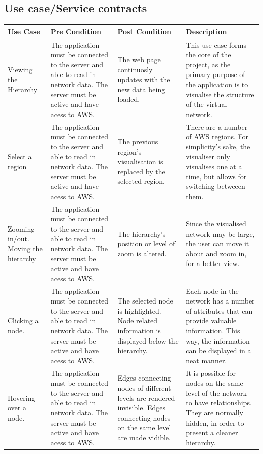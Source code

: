 \documentclass[hidelinks,a4paper,12pt]{article}
\begin{document}
		\subsection{Use case/Service contracts}
		\begin{tabular}{ | p{3cm} | p{4cm} | p{4cm} | p{4cm} |}
			\hline
			Use Case & Pre Condition & Post Condition & Description \\ \hline
			
			Viewing the Hierarchy & The application must be connected to the server and able to read in network data. The server must be active and have acess to AWS.& The web page continuosly updates with the new data being loaded. & This use case forms the core of the project, as the primary purpose of the application is to visualise the structure of the virtual network.\\ \hline
			
			Select a region 	& The application must be connected to the server and able to read in network data. The server must be active and have acess to AWS.& The previous region's visualisation is replaced by the selected region. & There are a number of AWS regions. For simplicity's sake, the visualiser only visualises one at a time, but allows for switching betweeen them.\\ \hline
			
			Zooming in/out. Moving the hierarchy	& The application must be connected to the server and able to read in network data. The server must be active and have acess to AWS.& The hierarchy's position or level of zoom is altered. & Since the visualised network may be large, the user can move it about and zoom in, for a better view.\\ \hline
			
			Clicking a node.& The application must be connected to the server and able to read in network data. The server must be active and have acess to AWS.& The selected node is highlighted. Node related information is displayed below the hierarchy. & Each node in the network has a number of attributes that can provide valuable information. This way, the information can be displayed in a neat manner.\\ \hline
			
			Hovering over a node.& The application must be connected to the server and able to read in network data. The server must be active and have acess to AWS.& Edges connecting nodes of different levels are rendered invisible. Edges connecting nodes on the same level are made vidible. & It is possible for nodes on the same level of the network to have relationships. They are normally hidden, in order to present a cleaner hierarchy. \\ \hline
		\end{tabular}
\newpage		
\end{document}
